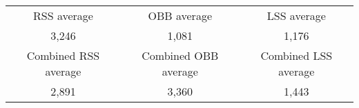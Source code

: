 \begin{tabular}{c|c|c}\\ 
RSS average & OBB average & LSS average\\ 
3,246 & 1,081 & 1,176\\ 
\hline 
Combined RSS average & Combined OBB average & Combined LSS average\\ 
2,891 & 3,360 & 1,443\\ 
\end{tabular}